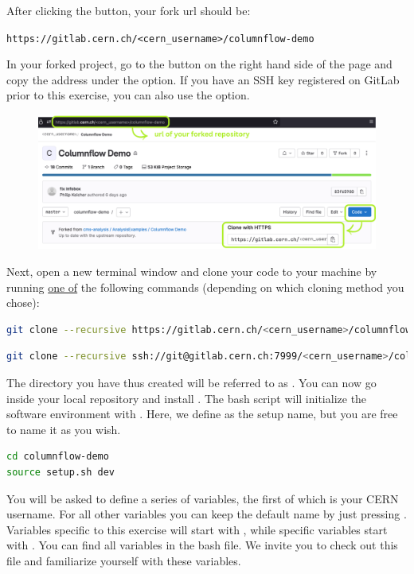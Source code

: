 After clicking the  button, your fork url should be:

\texttt{https://gitlab.cern.ch/<cern\_username>/columnflow-demo}

\newpage
In your forked project, go to the  button on the right hand side of the page and copy the address under the  option. If you have an SSH key registered on GitLab prior to this exercise, you can also use the  option.

\begin{figure}[!h]
    \centering
    \includegraphics[scale=0.62]{images/fork2.png}
\end{figure}

Next, open a new terminal window and clone your code to your machine by running \underline{one of} the following commands (depending on which cloning method you chose):

\begin{lstlisting}[language=bash]
git clone --recursive https://gitlab.cern.ch/<cern_username>/columnflow-demo.git
\end{lstlisting}
\begin{lstlisting}[language=bash]
git clone --recursive ssh://git@gitlab.cern.ch:7999/<cern_username>/columnflow-demo.git
\end{lstlisting}

The directory you have thus created will be referred to as . You can now go inside your local repository and install \columnflow. The  bash script will initialize the software environment with . Here, we define  as the setup name, but you are free to name it as you wish.

\begin{lstlisting}[language=bash]
cd columnflow-demo
source setup.sh dev
\end{lstlisting}


You will be asked to define a series of variables, the first of which is your CERN username.
For all other variables you can keep the default name by just pressing .
Variables specific to this exercise will start with , while \columnflow specific variables start with .
You can find all variables in the  bash file.
We invite you to check out this file and familiarize yourself with these variables.


